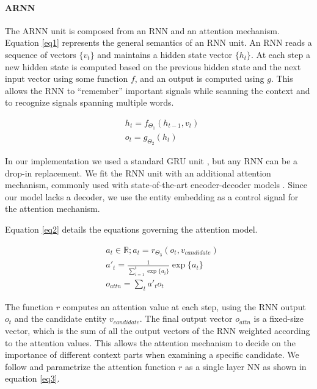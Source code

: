 \documentclass[11pt]{article}
\begin{document}
	\paragraph{ARNN}
	The ARNN unit is composed from an RNN and an attention mechanism. Equation \ref{eq1} represents the general semantics of an RNN unit. An RNN reads a sequence of vectors $\{v_t\}$ and maintains a hidden state vector $\{h_t\}$. At each step a new hidden state is computed based on the previous hidden state and the next input vector using some function $f$, and an output is computed using $g$. This allows the RNN to ``remember'' important signals while scanning the context and to recognize signals spanning multiple words.
	
	\begin{equation}
	\label{eq1}
	\begin{aligned}
	& h_t=f_{\Theta_1}(h_{t-1}, v_t) \\
	& o_t=g_{\Theta_2}(h_t)
	\end{aligned}
	\end{equation}
	
	In our implementation we used a standard GRU unit \cite{cho2014learning}, but any RNN can be a drop-in replacement. We fit the RNN unit with an additional attention mechanism, commonly used with state-of-the-art encoder-decoder models \cite{bahdanau2014neural,xu2015show}. Since our model lacks a decoder, we use the entity embedding as a control signal for the attention mechanism.
	
	Equation \ref{eq2} details the equations governing the attention model.
	
	\begin{equation}
	\label{eq2}
	\begin{aligned}
	& a_t \in \mathbb{R}; a_t=r_{\Theta_3}(o_t, v_{candidate}) \\
	& a'_t  = \frac{1}{\sum_{i=1}^{t} \exp\{a_i\}} \exp \{a_t\} \\
	& o_{attn}=\sum_{t} a'_t o_t
	\end{aligned}
	\end{equation}
	
	The function $r$ computes an attention value at each step, using the RNN output $o_t$ and the candidate entity $v_{candidate}$. The final output vector $o_{attn}$ is a fixed-size vector, which is the sum of all the output vectors of the RNN weighted according to the attention values. This allows the attention mechanism to decide on the importance of different context parts when examining a specific candidate. We follow  and parametrize the attention function $r$ as a single layer NN as shown in equation \ref{eq3}.
	
\end{document}
